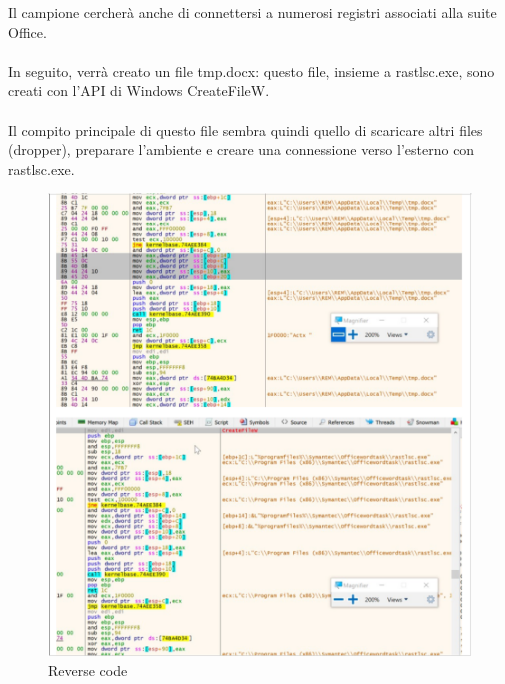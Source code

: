 \documentclass[8pt]{extarticle}
\begin{document}
\noindent
Il campione cercherà anche di connettersi a numerosi registri associati alla suite Office.\\\\
In seguito, verrà creato un file tmp.docx: questo file, insieme a rastlsc.exe, 
sono creati con l’API di Windows CreateFileW.\\\\
Il compito principale di questo file sembra quindi quello di scaricare altri files (dropper), 
preparare l’ambiente e creare una connessione verso l’esterno con rastlsc.exe.
\begin{figure}[H]
    \center
    \includegraphics[scale=0.3]{images/OceanLotus2.png}
    \caption{Reverse code}\label{fig:1}
\end{figure}
\end{document}
